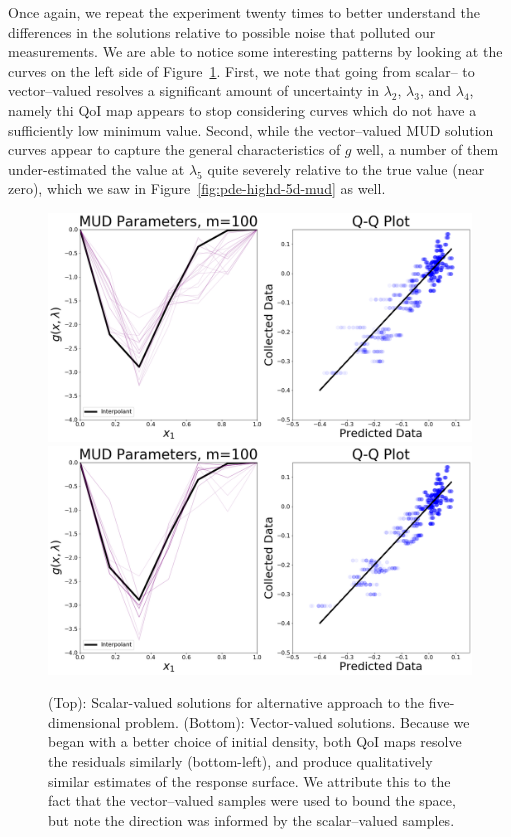 Once again, we repeat the experiment twenty times to better understand the differences in the solutions relative to possible noise that polluted our measurements.
We are able to notice some interesting patterns by looking at the curves on the left side of Figure~\ref{fig:pde-highd-5d-alt-mud}.
First, we note that going from scalar-- to vector--valued resolves a significant amount of uncertainty in $\lambda_2$, $\lambda_3$, and $\lambda_4$, namely thi QoI map appears to stop considering curves which do not have a sufficiently low minimum value.
Second, while the vector--valued MUD solution curves appear to capture the general characteristics of $g$ well, a number of them under-estimated the value at $\lambda_5$ quite severely relative to the true value (near zero), which we saw in Figure~\ref{fig:pde-highd-5d-mud} as well.

\begin{figure}[htbp]
\centering
  \includegraphics[width=0.95\linewidth]{figures/pde-highd/pde-highd_pair_D-alt-5-1_m100}
  \includegraphics[width=0.95\linewidth]{figures/pde-highd/pde-highd_pair_D-alt-5-5_m100}
\caption{
(Top): Scalar-valued solutions for alternative approach to the five-dimensional problem.
(Bottom): Vector-valued solutions.
Because we began with a better choice of initial density, both QoI maps resolve the residuals similarly (bottom-left), and produce qualitatively similar estimates of the response surface. We attribute this to the fact that the vector--valued samples were used to bound the space, but note the direction was informed by the scalar--valued samples.
}
\label{fig:pde-highd-5d-alt-mud}
\end{figure}
\FloatBarrier


